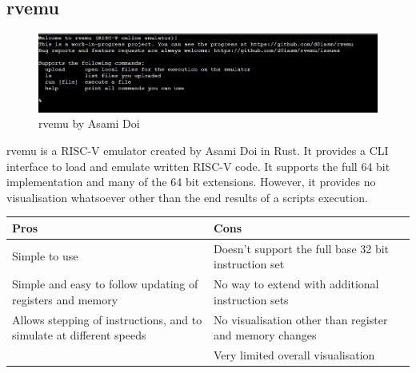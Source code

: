 \subsection{rvemu}
\begin{figure}[H]
    \centering
    \includegraphics[width=0.85\linewidth]{dissertation/DATA/RVEMU.jpg}
    \caption{rvemu by Asami Doi}
    \label{fig:rvemu}
\end{figure}
rvemu \cite{doi_2021_d0iasmrvemu} is a RISC-V emulator created by Asami Doi in Rust. It provides a CLI interface to load and emulate written RISC-V code. It supports the full 64 bit implementation and many of the 64 bit extensions. However, it provides no visualisation whatsoever other than the end results of a scripts execution.

\begin{table}[H]
\begin{tabular}{|p{0.5\linewidth} | p{0.5\linewidth}|}
\hline
\textbf{Pros}                                                        & \textbf{Cons}                                           \\ \hline
Simple to use                                                        & Doesn't support the full base 32 bit instruction set    \\ \hline
Simple and easy to follow updating of registers and memory           & No way to extend with additional instruction sets       \\ \hline
Allows stepping of instructions, and to simulate at different speeds & No visualisation other than register and memory changes \\ \hline
                                                                     & Very limited overall visualisation                      \\ \hline
\end{tabular}
\end{table}

